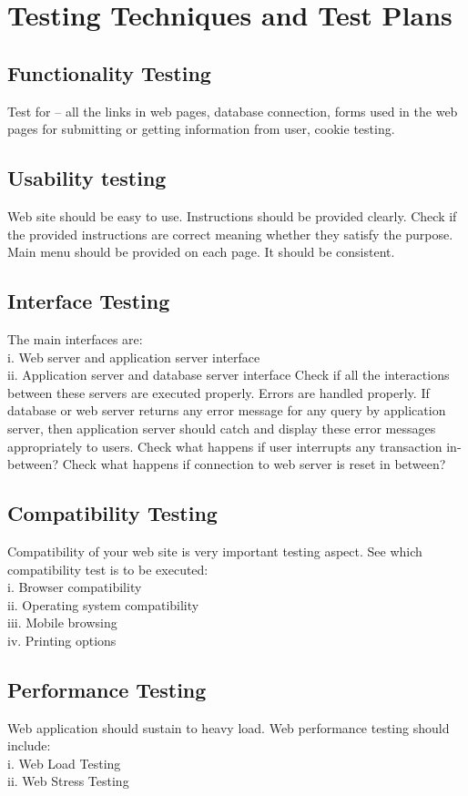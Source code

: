 	\section{Testing Techniques and Test Plans
}
\subsection{Functionality Testing}
Test for – all the links in web pages, database connection, forms used in the web pages for
submitting or getting information from user, cookie testing.

\subsection{Usability testing}
Web site should be easy to use. Instructions should be provided clearly. Check if the provided
instructions are correct meaning whether they satisfy the purpose. Main menu should be
provided on each page. It should be consistent.

\subsection{Interface Testing}
The main interfaces are:
\\ i. Web server and application server interface
\\ ii. Application server and database server interface
Check if all the interactions between these servers are executed properly. Errors are handled
properly. If database or web server returns any error message for any query by application
server, then application server should catch and display these error messages appropriately to
users. Check what happens if user interrupts any transaction in-between? Check what happens
if connection to web server is reset in between?
\subsection{Compatibility Testing}
Compatibility of your web site is very important testing aspect. See which compatibility test is
to be executed:
\\i. Browser compatibility
\\ii. Operating system compatibility
\\iii. Mobile browsing
\\iv. Printing options
\subsection{Performance Testing}
Web application should sustain to heavy load. Web performance testing should include:
\\i. Web Load Testing
\\ii. Web Stress Testing

